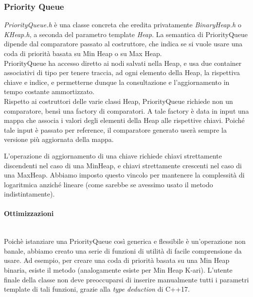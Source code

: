 \subsubsection{Priority Queue}

\textit{PriorityQueue.h} è una classe concreta che eredita privatamente \textit{BinaryHeap.h} o \textit{KHeap.h}, a seconda del parametro template \textit{Heap}.
La semantica di PriorityQueue dipende dal comparatore passato al costruttore, che indica se si vuole usare una coda di priorità basata su Min Heap o su Max Heap. \\

\noindent PriorityQueue ha accesso diretto ai nodi salvati nella Heap, e usa due container associativi di tipo  per tenere traccia, ad ogni elemento della Heap, la rispettiva chiave e indice, e permetterne dunque la consultazione e l'aggiornamento in tempo costante ammortizzato. \\

\noindent Rispetto ai costruttori delle varie classi Heap, PriorityQueue richiede non un comparatore, bensì una factory di comparatori. A tale factory è data in input una mappa che associa i valori degli elementi della Heap alle rispettive chiavi. Poiché tale input è passato per reference, il comparatore generato userà sempre la versione più aggiornata della mappa.

\noindent L'operazione di aggiornamento di una chiave richiede chiavi strettamente discendenti nel caso di una MinHeap, e chiavi strettamente crescenti nel caso di una MaxHeap. Abbiamo imposto questo vincolo per mantenere la complessità di  logaritmica anziché lineare (come sarebbe se avessimo usato il metodo  indistintamente).

\paragraph{Ottimizzazioni}\mbox{} \\

\noindent Poichè istanziare una PriorityQueue così generica e flessibile è un'operazione non banale, abbiamo creato una serie di funzioni di utilità di facile comprensione da usare. Ad esempio, per creare una coda di priorità basata su una Min Heap binaria, esiste il metodo  (analogamente esiste  per Min Heap K-ari).
L'utente finale della classe non deve preoccuparsi di inserire manualmente tutti i parametri template di tali funzioni, grazie alla \textit{type deduction} di C++17.

